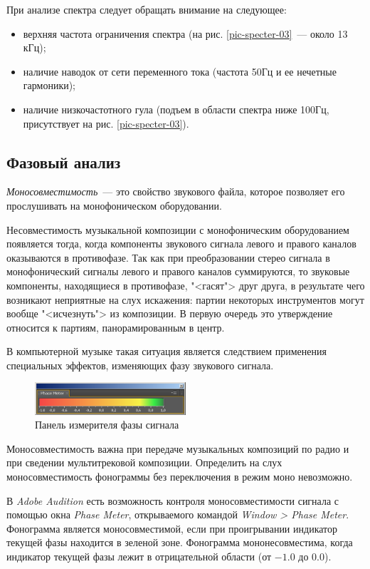 \documentclass[oneside, final, 14pt]{extreport}
\begin{document}
При анализе спектра следует обращать внимание на следующее:
\begin{itemize}
\item верхняя частота ограничения спектра (на рис. \ref{pic-specter-03}~--- около 13 кГц);
\item наличие наводок от сети переменного тока (частота 50Гц и ее нечетные гармоники);
\item наличие низкочастотного гула (подъем в области спектра ниже 100Гц, присутствует на рис. \ref{pic-specter-03}).
\end{itemize}

\subsection{Фазовый анализ}
\textit{Моносовместимость}~--- это свойство звукового файла, которое позволяет его прослушивать на монофоническом оборудовании. 

Несовместимость музыкальной композиции с монофоническим оборудованием появляется тогда, когда компоненты звукового сигнала левого и правого каналов оказываются в противофазе. Так как при преобразовании стерео сигнала в монофонический сигналы левого и правого каналов суммируются, то звуковые компоненты, находящиеся в противофазе, "<гасят"> друг друга, в результате чего возникают неприятные на слух искажения: партии некоторых инструментов могут вообще "<исчезнуть"> из композиции. В первую очередь это утверждение относится к партиям, панорамированным в центр. 

В компьютерной музыке такая ситуация является следствием применения специальных эффектов, изменяющих фазу звукового сигнала. 

\begin{figure}[h!]
\centering
\includegraphics[width=0.5\textwidth]{pic-phase-01}
\caption{Панель измерителя фазы сигнала}
\label{pic-phase-01}
\end{figure}

Моносовместимость важна при передаче музыкальных композиций по радио и при сведении мультитрековой композиции. Определить на слух моносовместимость фонограммы без переключения в режим моно невозможно. 

В \textit{Adobe Audition} есть возможность контроля моносовместимости сигнала с помощью окна \textit{Phase Meter}, открываемого командой \textit{Window > Phase Meter}. Фонограмма является моносовместимой, если при проигрывании индикатор текущей фазы находится в зеленой зоне. Фонограмма мононесовместима, когда индикатор текущей фазы лежит в отрицательной области (от $-1.0$ до $0.0$).
\end{document}
